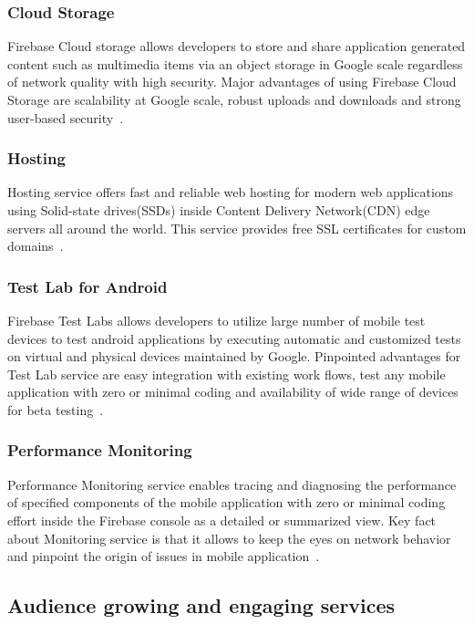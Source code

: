 \subsubsection{Cloud Storage} Firebase Cloud storage allows developers to store
and share application generated content such as multimedia items via an object
storage in Google scale regardless of network quality with high security. Major
advantages of using Firebase Cloud Storage are scalability at Google scale,
robust uploads and downloads and strong user-based
security~\cite{hid-sp18-409-www-firebase-products}.

\subsubsection{Hosting} Hosting service offers fast and reliable web hosting for
modern web applications using Solid-state drives(SSDs) inside Content Delivery
Network(CDN) edge servers all around the world. This service provides free SSL
certificates for custom domains~\cite{hid-sp18-409-www-firebase,
	hid-sp18-409-www-firebase-products}.

\subsubsection{Test Lab for Android } Firebase Test Labs allows developers to
utilize large number of mobile test devices to test android applications by
executing automatic and customized tests on virtual and physical devices
maintained by Google. Pinpointed advantages for Test Lab service are easy
integration with existing work flows, test any mobile application with zero or
minimal coding and availability of wide range of devices for beta
testing~\cite{hid-sp18-409-www-firebase-products}.

\subsubsection{Performance Monitoring} Performance Monitoring service enables
tracing and diagnosing the performance of specified components of the mobile
application with zero or minimal coding effort inside the Firebase console as a
detailed or summarized view. Key fact about Monitoring service is that it allows
to keep the eyes on network behavior and pinpoint the origin of issues in mobile
application~\cite{hid-sp18-409-www-firebase-products}.


\subsection{Audience growing and engaging services}

